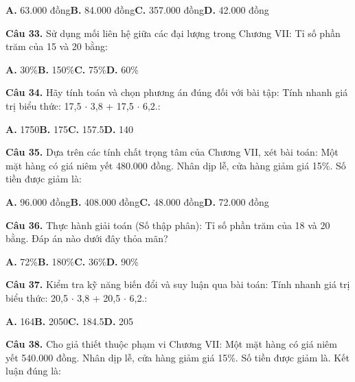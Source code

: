 \documentclass[11pt,a4paper]{article}
\begin{document}
\hspace*{1.5em}\textbf{A.} 63.000 đồng\quad\quad \textbf{B.} 84.000 đồng\quad\quad \textbf{C.} 357.000 đồng\quad\quad \textbf{D.} 42.000 đồng\par\vspace{2pt}
\textbf{\color{primary} Câu 33.} Sử dụng mối liên hệ giữa các đại lượng trong Chương VII: Tỉ số phần trăm của 15 và 20 bằng:\par
\hspace*{1.5em}\textbf{A.} 30\%\quad\quad \textbf{B.} 150\%\quad\quad \textbf{C.} 75\%\quad\quad \textbf{D.} 60\%\par\vspace{2pt}
\textbf{\color{primary} Câu 34.} Hãy tính toán và chọn phương án đúng đối với bài tập: Tính nhanh giá trị biểu thức: 17,5 $\cdot$ 3,8 + 17,5 $\cdot$ 6,2.:\par
\hspace*{1.5em}\textbf{A.} 1750\quad\quad \textbf{B.} 175\quad\quad \textbf{C.} 157.5\quad\quad \textbf{D.} 140\par\vspace{2pt}
\textbf{\color{primary} Câu 35.} Dựa trên các tính chất trọng tâm của Chương VII, xét bài toán: Một mặt hàng có giá niêm yết 480.000 đồng. Nhân dịp lễ, cửa hàng giảm giá 15\%. Số tiền được giảm là:\par
\hspace*{1.5em}\textbf{A.} 96.000 đồng\quad\quad \textbf{B.} 408.000 đồng\quad\quad \textbf{C.} 48.000 đồng\quad\quad \textbf{D.} 72.000 đồng\par\vspace{2pt}
\textbf{\color{primary} Câu 36.} Thực hành giải toán (Số thập phân): Tỉ số phần trăm của 18 và 20 bằng. Đáp án nào dưới đây thỏa mãn?\par
\hspace*{1.5em}\textbf{A.} 72\%\quad\quad \textbf{B.} 180\%\quad\quad \textbf{C.} 36\%\quad\quad \textbf{D.} 90\%\par\vspace{2pt}
\textbf{\color{primary} Câu 37.} Kiểm tra kỹ năng biến đổi và suy luận qua bài toán: Tính nhanh giá trị biểu thức: 20,5 $\cdot$ 3,8 + 20,5 $\cdot$ 6,2.:\par
\hspace*{1.5em}\textbf{A.} 164\quad\quad \textbf{B.} 2050\quad\quad \textbf{C.} 184.5\quad\quad \textbf{D.} 205\par\vspace{2pt}
\textbf{\color{primary} Câu 38.} Cho giả thiết thuộc phạm vi Chương VII: Một mặt hàng có giá niêm yết 540.000 đồng. Nhân dịp lễ, cửa hàng giảm giá 15\%. Số tiền được giảm là. Kết luận đúng là:\par
\end{document}
